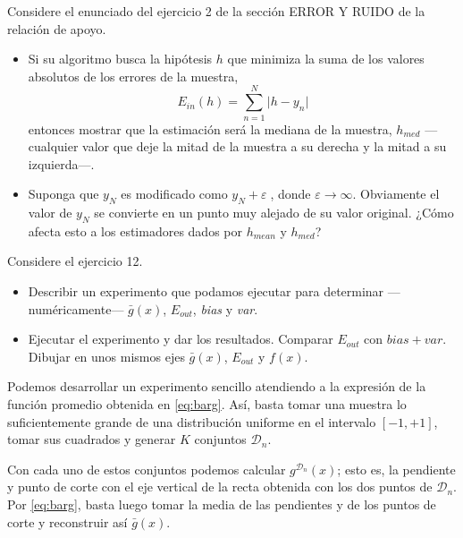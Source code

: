 \documentclass[a4paper, 11pt]{article}
\begin{document}
    \begin{bonus}
        Considere el enunciado del ejercicio 2 de la sección ERROR Y RUIDO de la relación de apoyo.
        \begin{itemize}
            \item Si su algoritmo busca la hipótesis $h$ que minimiza la suma de los valores absolutos de los errores de la muestra,
            \[
            E_{in}(h) = \sum_{n=1}^N \vert h - y_n \vert
            \]
            entonces mostrar que la estimación será la mediana de la muestra, $h_{med}$ ---cualquier valor que deje la mitad de la muestra a su derecha y la mitad a su izquierda---.
            \item Suponga que $y_N$ es modificado como $y_N + \varepsilon$, donde $\varepsilon \to \infty$. Obviamente el valor de $y_N$ se convierte en un punto muy alejado de su valor original. ¿Cómo afecta esto a los estimadores dados por $h_{mean}$ y $h_{med}$?
        \end{itemize}
    \end{bonus}



    \begin{bonus}
        Considere el ejercicio 12.
        \begin{itemize}
            \item Describir un experimento que podamos ejecutar para determinar ---numéricamente--- $\bar{g}(x)$, $E_{out}$, \emph{bias} y \emph{var}.
            \item Ejecutar el experimento y dar los resultados. Comparar $E_{out}$ con $bias+var$. Dibujar en unos mismos ejes $\bar{g}(x)$, $E_{out}$ y $f(x)$.
        \end{itemize}
    \end{bonus}

    \begin{solucion}
        Podemos desarrollar un experimento sencillo atendiendo a la expresión de la función promedio obtenida en \ref{eq:barg}. Así, basta tomar una muestra lo suficientemente grande de una distribución uniforme en el intervalo $[-1,+1]$, tomar sus cuadrados y generar $K$ conjuntos $\mathcal{D}_n$.

        Con cada uno de estos conjuntos podemos calcular $g^{\mathcal{D}_n}(x)$; esto es, la pendiente y punto de corte con el eje vertical de la recta obtenida con los dos puntos de $\mathcal{D}_n$. Por \ref{eq:barg}, basta luego tomar la media de las pendientes y de los puntos de corte y reconstruir así $\bar{g}(x)$.
    \end{solucion}

    \nocite{*}



\end{document}

